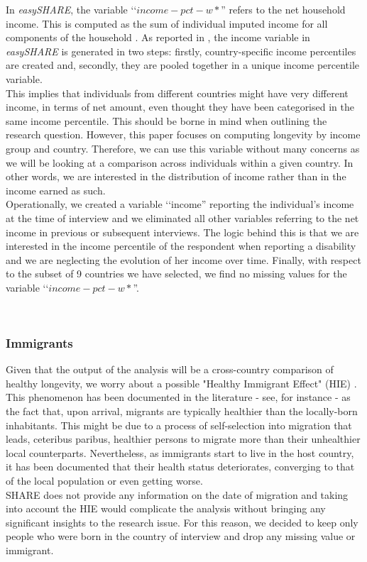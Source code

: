 \documentclass[\main/main.tex]{subfiles}
\begin{document}
In \textit{easySHARE}, the variable \lq\lq $income-pct-w*$'' refers to the net household income. This is computed as the sum of individual imputed income for all components of the household \citep{Adeline2016SomeIncomeb}. 
As reported in \cite{Gruber2014GeneratingProgramming}, the income variable in \textit{easySHARE} is generated in two steps: firstly, country-specific income percentiles are created and, secondly, they are pooled together in a unique income percentile variable.\\

This implies that individuals from different countries might have very different income, in terms of net amount, even thought they have been categorised in the same income percentile. This should be borne in mind when outlining the research question.
However, this paper focuses on computing longevity by income group and country. Therefore, we can use this variable without many concerns as we will be looking at a comparison across individuals within a given country. In other words, we are interested in the distribution of income rather than in the income earned as such.\\

Operationally, we created a variable \lq\lq income'' reporting the individual's income at the time of interview and we eliminated all other variables referring to the net income in previous or subsequent interviews. The logic behind this is that we are interested in the income percentile of the respondent when reporting a disability and we are neglecting the evolution of her income over time. Finally, with respect to the subset of 9 countries we have selected, we find no missing values for the variable \lq\lq $income-pct-w*$''.

\\

\subsubsection{Immigrants}
Given that the output of the analysis will be a cross-country comparison of healthy longevity, we worry about a possible "Healthy Immigrant Effect" (HIE) . This phenomenon has been documented in the literature - see, for instance \cite{Deri2004UnderstandingCanada, Kennedy2006TheCountries} - as the fact that, upon  arrival, migrants are typically healthier than the locally-born inhabitants. This might be due to a process of self-selection into migration that leads, ceteribus paribus, healthier persons to migrate more than their unhealthier local counterparts. Nevertheless, as immigrants start to live in the host country, it has been documented that their health status deteriorates, converging to that of the local population or even getting worse.\\
SHARE does not provide any information on the date of migration and taking into account the HIE would complicate the analysis without bringing any significant insights to the research issue. For this reason, we decided to keep only people who were born in the country of interview and drop any missing value or immigrant.
\end{document}
